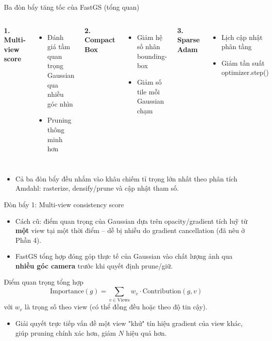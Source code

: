 \begin{frame}{Ba đòn bẩy tăng tốc của FastGS (tổng quan)}
\begin{columns}[t]
\centering
\textbf{1. Multi-view score}
\begin{itemize}
    \footnotesize
    \item Đánh giá tầm quan trọng Gaussian qua nhiều góc nhìn
    \item Pruning thông minh hơn
\end{itemize}
\centering
\textbf{2. Compact Box}
\begin{itemize}
    \footnotesize
    \item Giảm hệ số nhân bounding-box
    \item Giảm số tile mỗi Gaussian chạm
\end{itemize}
\centering
\textbf{3. Sparse Adam}
\begin{itemize}
    \footnotesize
    \item Lịch cập nhật phân tầng
    \item Giảm tần suất optimizer.step()
\end{itemize}
\end{columns}
\vspace{0.4cm}
\begin{itemize}
    \item Cả ba đòn bẩy đều nhắm vào khâu chiếm tỉ trọng lớn nhất theo phân tích Amdahl: rasterize, densify/prune và cập nhật tham số.
\end{itemize}
\end{frame}

\begin{frame}{Đòn bẩy 1: Multi-view consistency score}
\begin{itemize}
    \item Cách cũ: điểm quan trọng của Gaussian dựa trên opacity/gradient tích luỹ từ \textbf{một} view tại một thời điểm -- dễ bị nhiễu do gradient cancellation (đã nêu ở Phần 4).
    \item FastGS tổng hợp đóng góp thực tế của Gaussian vào chất lượng ảnh qua \textbf{nhiều góc camera} trước khi quyết định prune/giữ.
\end{itemize}
\begin{block}{Điểm quan trọng tổng hợp}
\[
\text{Importance}(g) = \sum_{v \in \text{Views}} w_v \cdot \text{Contribution}(g, v)
\]
với $w_v$ là trọng số theo view (có thể đồng đều hoặc theo độ tin cậy).
\end{block}
\begin{itemize}
    \item Giải quyết trực tiếp vấn đề một view "khử" tín hiệu gradient của view khác, giúp pruning chính xác hơn, giảm $N$ hiệu quả hơn.
\end{itemize}
\end{frame}

